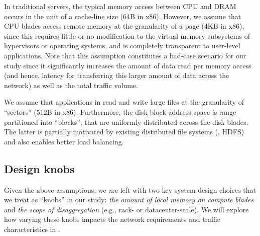 
In traditional servers, the typical memory access between CPU and DRAM occurs in the unit of a cache-line size (64B in x86). However, we assume that CPU blades access remote memory at the granularity of a page (4KB in x86), since this requires little or no modification to the virtual memory subsystems of hypervisors or operating systems, and is completely transparent to user-level applications. Note that this assumption constitutes a bad-case scenario for our study since it significantly increases the amount of data read per memory access (and hence, latency for transferring this larger amount of data across the network) as well as the total traffic volume.


We assume that applications in \dis read and write large files at the granularity of ``sectors'' ($512$B in x86). Furthermore, the disk block address space is range partitioned into ``blocks'', that are uniformly distributed across the disk blades. The latter is partially motivated by existing distributed file systems (\eg, HDFS) and also enables better load balancing. %

\vspace{-0.1in}
\subsection{Design knobs}
\label{ssec:knobs}
\vspace{-0.05in}
Given the above assumptions, we are left with two key system design choices that we treat as ``knobs'' in our study: {\em the amount of local memory on compute blades} and  {\em the scope of disaggregation} (e.g., rack- or datacenter-scale). We will explore how varying these knobs impacts the network requirements and traffic characteristics in \dis. 

